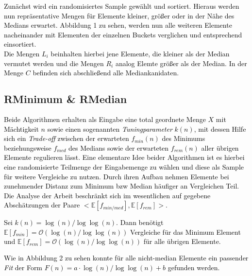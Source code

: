 \documentclass[a1,portrait]{a0poster}
\begin{document}
\noindent
\textcolor{black}{
Zunächst wird ein randomisiertes Sample gewählt und sortiert. 
Hieraus werden nun repräsentative Mengen für Elemente kleiner, größer 
oder in der Nähe des Medians erwartet. 
Abbildung 1 zu sehen, werden nun alle weiteren Elemente nacheinander 
mit Elementen der einzelnen Buckets verglichen und entsprechend einsortiert.\\
Die Mengen $L_i$ beinhalten hierbei jene Elemente, die kleiner als der Median vermutet 
werden und die Mengen $R_i$ analog Elemte größer als der Median. 
In der Menge $C$ befinden sich abschließend alle Mediankanidaten.
}\\
\color{goetheblau}{\rule{\textwidth}{0.1cm}}
\begin{multicols}{2}
\section{RMinimum \& RMedian}
\vspace*{-0.05cm}
\noindent
\textcolor{black}{
Beide Algorithmen erhalten als Eingabe eine total geordnete Menge $X$ 
mit Mächtigkeit $n$ sowie einen sogenannten \textit{Tuningparameter} $k(n)$, 
mit dessen Hilfe sich ein \textit{Trade-off} zwischen der erwarteten 
\fg $f_{min}(n)$ des Minimums beziehungsweise $f_{med}$ des Medians sowie der 
erwarteten \fg $f_{rem}(n)$ aller übrigen Elemente regulieren lässt. 
Eine elementare Idee beider Algorithmen ist es hierbei eine randomisierte Teilmenge 
der Eingabemenge zu wählen und diese als Sample für weitere Vergleiche zu nutzen.
Durch ihren Aufbau nehmen Elemente bei zunehmender Distanz zum 
Minimum bzw Median häufiger an Vergleichen Teil.\\
Die Analyse der Arbeit beschränkt sich im wesentlichen auf gegebene 
Abschätzungen der Paare $<\mathbb{E}[f_{min/med}],\mathbb{E}[f_{rem}]>$.}
\begin{manualtheorem}{1}
    \textcolor{black}{
    Sei $k(n)=\log(n)/\log\log(n)$. Dann benötigt \Rm $\mathbb{E}[f_{min}]=\mathcal{O}(\log(n)/\log\log(n))$ Vergleiche für das Minimum Element und $\mathbb{E}[f_{rem}]=\mathcal{O}(\log(n)/\log\log(n))$ für alle übrigen Elemente.}
\end{manualtheorem}

\noindent
\textcolor{black}{
Wie in Abbildung 2 zu sehen konnte für alle nicht-median Elemente ein passender \textit{Fit} der Form $F(n) = a \cdot \log(n)/ \log\log(n) + b$ gefunden werden.}


\end{multicols}
\end{document}
